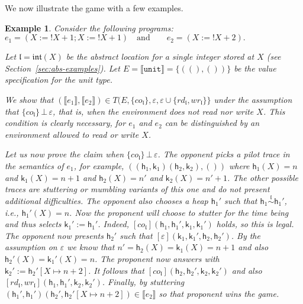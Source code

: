 \documentclass[nocopyrightspace,preprint]{sigplanconf}
\newcommand{\keywd}[1]{\mathtt{#1}}
\newcommand{\myread}[1]{!{#1}}
\newcommand{\unittype}{\keywd{unit}}
\newcommand\orth[2]{\ensuremath{#1\,\bot\, #2}\xspace}
\newcommand{\assign}[2]{{#1}:={#2}}
\newcommand{\eff}{\varepsilon}
\newcommand{\sem}[1]{\ensuremath{\llbracket {#1} \rrbracket}}
\newcommand{\rEff}[1]{\ensuremath{\mathit{rd}_{#1}}}
\newcommand{\cEff}[1]{\ensuremath{\mathit{co}_{#1}}}
\newcommand{\wEff}[1]{\ensuremath{\mathit{wr}_{#1}}}
\newtheorem{example}[theorem]{Example}
\newcommand{\loc}{\mathfrak{l}}
\newcommand{\locInt}{\ensuremath{\mathfrak{int}}\xspace}
\newcommand{\cloc}{\ensuremath{X}\xspace}
\newcommand\heap{\ensuremath{\mathsf{h}}\xspace}
\newcommand\h{\heap}
\renewcommand\k{\ensuremath{\mathsf{k}}\xspace}
\newcommand\rloc[3]{\ensuremath{#1 \stackrel{#3}{\sim} #2}}
\newcommand{\tup}[1]{(#1)}
\begin{document}
We now illustrate the game with a few examples. 
\begin{example}
\label{jife}
\normalfont
 Consider the following programs:
 \(
 e_1 = (\assign{\cloc}{\myread{\cloc} + 1}; \assign{\cloc}{\myread{\cloc}+ 1})  \quad \textrm{and} \qquad  e_2 = 
 (\assign{\cloc}{\myread{\cloc} + 2}). 
 \)

 \noindent
Let $\loc = \locInt(\cloc)$ be the abstract location for a single integer stored at $\cloc$ (see Section~\ref{sec:abs-examples}). Let $E=\sem{\unittype}=
\{((),())\}$ be the value specification for the unit type.  

We  show that  $(\sem{e_1}, \sem{e_2}) \in T(E, 
\{\cEff{\loc}\}, \eff, \eff \cup \{\rEff{\loc}, \wEff{\loc}\}\}$ under the assumption that $\orth{\{\cEff{\loc}\}}{\eff}$, that is, when the environment does not 
read nor write $\cloc$.  This condition is clearly necessary, for $e_1$ and $e_2$ can be distinguished by an environment allowed to read or write $\cloc$. 

Let us now prove the claim when $\orth{\{\cEff{\loc}\}}{\eff}$. The opponent picks a pilot trace in the semantics of $e_1$, for example, 
\(
 \tup{(\h_1,\k_1)(\h_2,\k_2),()}
\)
\noindent
where $\h_1(\cloc)=n$ and $\k_1(\cloc)=n+1$ and $\h_2(\cloc)=n'$ and
$\k_2(\cloc)=n'+1$. The other possible traces are stuttering or
mumbling variants of this one and do not present additional
difficulties. The opponent also chooses a heap $\h_1'$ such that
$\rloc{\h_1}{\h_1'}{\loc}$, i.e., $\h_1'(\cloc)=n$.  Now the proponent
will choose to stutter for the time being and thus selects
$\k_1':=\h_1'$. Indeed, $[\cEff{\loc}](\h_1,\h_1',\k_1,\k_1')$ holds,
so this is legal. The opponent now presents $\h_2'$ such that
$[\eff](\k_1,\k_1',\h_2,\h_2')$. By the assumption on $\eff$ we know
that $n'=\h_2(\cloc)=\k_1(\cloc)=n+1$ and also
$\h_2'(\cloc)=\k_1'(\cloc)=n$. The proponent now answers with
$\k_2':=\h_2'[\cloc{\mapsto}n+2]$. It follows that
$[\cEff{\loc}](\h_2,\h_2',\k_2,\k_2')$ and also
$[\rEff{\loc},\wEff{\loc}](\h_1,\h_1',\k_2,\k_2')$. Finally, by
stuttering $(\h_1',\h_1')(\h_2',\h_2'[\cloc{\mapsto}n+2])\in\sem{e_2}$
so that proponent wins the game.
\end{example}
\end{document}
